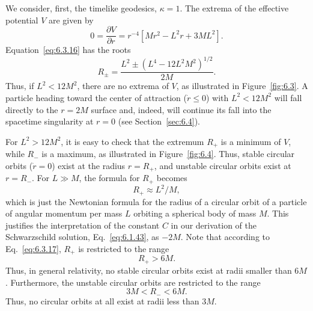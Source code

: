 We consider, first, the timelike geodesics, \(\kappa=1\). The extrema of the
effective potential \(V\) are given by
\begin{equation}
  0=\frac{\partial V}{\partial r}
  =r^{-4}[Mr^2-L^2r+3ML^2].
  \tag{6.3.16}\label{eq:6.3.16}
\end{equation}
Equation~\eqref{eq:6.3.16} has the roots
\begin{equation}
  R_\pm=\frac{L^2\pm(L^4-12L^2M^2)^{1/2}}{2M}.
  \tag{6.3.17}\label{eq:6.3.17}
\end{equation}
Thus, if \(L^2<12M^2\), there are no extrema of \(V\), as illustrated in
Figure~\ref{fig:6.3}. A particle heading toward the center of attraction
(\(\dot r\leq0\)) with \(L^2<12M^2\) will fall directly to the \(r=2M\) surface
and, indeed, will continue its fall into the spacetime singularity at \(r=0\)
(see Section~\ref{sec:6.4}).

For \(L^2>12M^2\), it is easy to check that the extremum \(R_+\) is a minimum of
\(V\), while \(R_-\) is a maximum, as illustrated in Figure~\ref{fig:6.4}. Thus,
stable circular orbits (\(\dot r=0\)) exist at the radius \(r=R_+\), and unstable
circular orbits exist at \(r=R_-\). For \(L\gg M\), the formula for \(R_+\)
becomes
\begin{equation}
  R_+\approx L^2/M,
  \tag{6.3.18}\label{eq:6.3.18}
\end{equation}
which is just the Newtonian formula for the radius of a circular orbit of a
particle of angular momentum per mass \(L\) orbiting a spherical body of mass
\(M\). This justifies the interpretation of the constant \(C\) in our derivation
of the Schwarzschild solution, Eq.~\eqref{eq:6.1.43}, as \(-2M\). Note that
according to Eq.~\eqref{eq:6.3.17}, \(R_+\) is restricted to the range
\begin{equation}
  R_+>6M.
  \tag{6.3.19}\label{eq:6.3.19}
\end{equation}
Thus, in general relativity, no stable circular orbits exist at radii smaller
than \(6M\). Furthermore, the unstable circular orbits are restricted to the
range
\begin{equation}
  3M<R_-<6M.
  \tag{6.3.20}\label{eq:6.3.20}
\end{equation}
Thus, no circular orbits at all exist at radii less than \(3M\).


